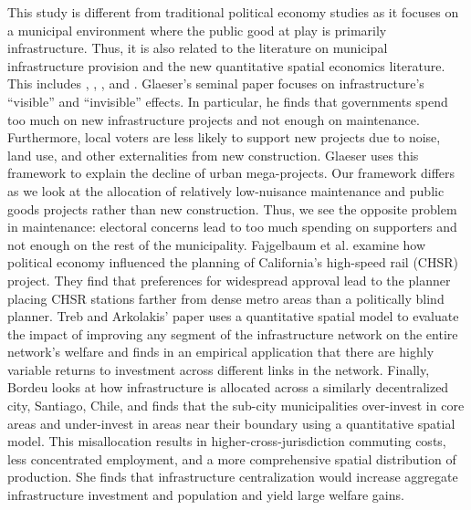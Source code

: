 This study is different from traditional political economy studies as it focuses on a municipal environment where the public good at play is primarily infrastructure. 
Thus, it is also related to the literature on municipal infrastructure provision and the new quantitative spatial economics literature.
This includes \cite{Glaeser2018political}, \cite{Fajgelbaum2023}, \cite{treb_arkolakis_2022_infrastructure}, and \cite{bordeu2023commuting}.
Glaeser's seminal paper focuses on infrastructure's ``visible'' and ``invisible'' effects. 
In particular, he finds that governments spend too much on new infrastructure projects and not enough on maintenance.
Furthermore, local voters are less likely to support new projects due to noise, land use, and other externalities from new construction.
Glaeser uses this framework to explain the decline of urban mega-projects.
Our framework differs as we look at the allocation of relatively low-nuisance maintenance and public goods projects rather than new construction.
Thus, we see the opposite problem in maintenance: electoral concerns lead to too much spending on supporters and not enough on the rest of the municipality.
Fajgelbaum et al. examine how political economy influenced the planning of California's high-speed rail (CHSR) project.
They find that preferences for widespread approval lead to the planner placing CHSR stations farther from dense metro areas than a politically blind planner.
Treb and Arkolakis' paper uses a quantitative spatial model to evaluate the impact of improving any segment of the infrastructure network on the entire network's welfare and finds in an empirical application that there are highly variable returns to investment across different links in the network.
Finally, Bordeu looks at how infrastructure is allocated across a similarly decentralized city, Santiago, Chile, and finds that the sub-city municipalities over-invest in core areas and under-invest in areas near their boundary using a quantitative spatial model.
This misallocation results in higher-cross-jurisdiction commuting costs, less concentrated employment, and a more comprehensive spatial distribution of production.
She finds that infrastructure centralization would increase aggregate infrastructure investment and population and yield large welfare gains.